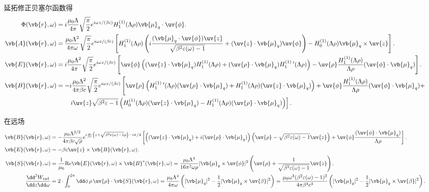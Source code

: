\begin{exbox}
	延拓修正贝塞尔函数得
	\begin{align*}
		\Phi(\vb{r}, \omega) &= i \frac{\mu_{0} \Lambda}{4\pi} \sqrt{\frac{\pi}{2}} e^{i\omega z/(\beta c)} H_{1}^{(1)}(\Lambda \rho) \vb{\mu}_{q} \cdot \uv{\phi}. \\
		\vb{A}(\vb{r}, \omega) &= \frac{\mu_{0} \Lambda^{2}}{4\pi \omega} \sqrt{\frac{\pi}{2}} e^{i\omega z/(\beta c)} \left[ H_{1}^{(1)}(\Lambda \rho) \left( i \frac{(\vb{\mu}_{q} \cdot \uv{\phi}) \uv{z}}{\sqrt{\beta^{2} \varepsilon(\omega) - 1}} + (\uv{z} \cdot \vb{\mu}_{q}) \uv{\phi} \right) - H_{0}^{(1)}(\Lambda \rho) \vb{\mu}_{q} \times \uv{z} \right]. \\
		\vb{E}(\vb{r}, \omega) &= i \frac{\mu_{0} \Lambda^{2}}{4\pi} \sqrt{\frac{\pi}{2}} e^{i\omega z/(\beta c)} \left[ \uv{\phi} \left( (\uv{z} \cdot \vb{\mu}_{q}) H_{1}^{(1)}(\Lambda \rho) + (\uv{\rho} \cdot \vb{\mu}_{q}) H_{1}^{(1)}\,'(\Lambda \rho) \right) - \uv{\rho} \frac{H_{1}^{(1)}(\Lambda \rho)}{\Lambda \rho} (\uv{\phi} \cdot \vb{\mu}_{q}) \right]. \\
		\vb{B}(\vb{r}, \omega) &= -i \frac{\mu_{0} \Lambda^{2}}{4\pi \beta c} \sqrt{\frac{\pi}{2}} e^{i\omega z/(\beta c)} \left[ \uv{\rho} \left( H_{1}^{(1)}\,'(\Lambda \rho) (\uv{\rho} \cdot \vb{\mu}_{q}) + H_{1}^{(1)}(\Lambda \rho) (\uv{z} \cdot \vb{\mu}_{q}) \right) + \uv{\phi} \frac{H_{1}^{(1)}(\Lambda \rho)}{\Lambda \rho} (\uv{\phi} \cdot \vb{\mu}_{q}) +\right.\\&\qquad\left. i \uv{z} \sqrt{\beta^{2} \varepsilon - 1} \left( H_{0}^{(1)}(\Lambda \rho) (\uv{z} \cdot \vb{\mu}_{q}) - H_{1}^{(1)}(\Lambda \rho) (\uv{\rho} \cdot \vb{\mu}_{q}) \right) \right].
	\end{align*}

	在远场
	\begin{align*}
		\vb{B}(\vb{r}, \omega) &= -\frac{\mu_{0} \Lambda^{3/2}}{4\pi \beta c \sqrt{\rho}} e^{i\frac{\omega}{\beta c} \left( z + \sqrt{\beta^{2} \varepsilon(\omega) - 1} \rho \right) - i\pi/4} \left[ \left( (\uv{z} \cdot \vb{\mu}_{q}) + i (\uv{\rho} \cdot \vb{\mu}_{q}) \right) \left( \uv{\rho} - \sqrt{\beta^{2} \varepsilon(\omega) - 1} \uv{z} \right) + \uv{\phi} \frac{(\uv{\phi} \cdot \vb{\mu}_{q})}{\Lambda \rho} \right]. \\
		\vb{E}(\vb{r}, \omega) &= -\beta c \uv{z} \times \vb{B}(\vb{r}, \omega). \\
		\vb{S}(\vb{r}, \omega) &= \frac{1}{\mu_{0}} \mathrm{Re} \vb{E}(\vb{r}, \omega) \times \vb{B}^{*}(\vb{r}, \omega) = \frac{\mu_{0} \Lambda^{4}}{16\pi^{2} \omega \rho} | \vb{\mu}_{q} \times \uv{\phi} |^{2} \left( \uv{\rho} + \frac{1}{\sqrt{\beta^{2} \varepsilon(\omega) - 1}} \uv{z} \right). \\
		\frac{\dd^{2} W_{\mathrm{rad}}}{\dd z \dd \omega} &= 2 \cdot \int_{0}^{2\pi} \dd \phi \, \rho \, \uv{\rho} \cdot \vb{S}(\vb{r}, \omega) = \frac{\mu_{0} \Lambda^{4}}{4\pi \omega} \left( | \vb{\mu}_{q} |^{2} - \frac{1}{2} | \vb{\mu}_{q} \times \uv{\beta} |^{2} \right) = \frac{\mu_{0} \omega^{3} (\beta^{2} \varepsilon(\omega) - 1)^{2}}{4\pi \beta^{4} c^{4}} \left( | \vb{\mu}_{q} |^{2} - \frac{1}{2} | \vb{\mu}_{q} \times \uv{\beta} |^{2} \right).
	\end{align*}


\end{exbox}
